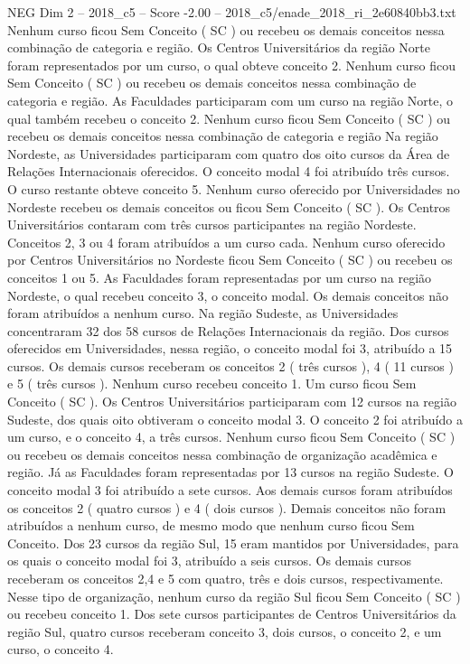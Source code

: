 \begin{textsample}{NEG Dim 2 – 2018\_c5 – Score -2.00 – 2018\_c5/enade\_2018\_ri\_2e60840bb3.txt}
Nenhum curso ficou Sem Conceito ( SC ) ou recebeu os demais conceitos nessa combinação de categoria e região.
Os Centros Universitários da região Norte foram representados por um curso, o qual obteve conceito 2.
Nenhum curso ficou Sem Conceito ( SC ) ou recebeu os demais conceitos nessa combinação de categoria e região.
As Faculdades participaram com um curso na região Norte, o qual também recebeu o conceito 2.
Nenhum curso ficou Sem Conceito ( SC ) ou recebeu os demais conceitos nessa combinação de categoria e região Na região Nordeste, as Universidades participaram com quatro dos oito cursos da Área de Relações Internacionais oferecidos.
O conceito modal 4 foi atribuído três cursos.
O curso restante obteve conceito 5.
Nenhum curso oferecido por Universidades no Nordeste recebeu os demais conceitos ou ficou Sem Conceito ( SC ).
Os Centros Universitários contaram com três cursos participantes na região Nordeste.
Conceitos 2, 3 ou 4 foram atribuídos a um curso cada.
Nenhum curso oferecido por Centros Universitários no Nordeste ficou Sem Conceito ( SC ) ou recebeu os conceitos 1 ou 5.
As Faculdades foram representadas por um curso na região Nordeste, o qual recebeu conceito 3, o conceito modal.
Os demais conceitos não foram atribuídos a nenhum curso.
Na região Sudeste, as Universidades concentraram 32 dos 58 cursos de Relações Internacionais da região.
Dos cursos oferecidos em Universidades, nessa região, o conceito modal foi 3, atribuído a 15 cursos.
Os demais cursos receberam os conceitos 2 ( três cursos ), 4 ( 11 cursos ) e 5 ( três cursos ).
Nenhum curso recebeu conceito 1.
Um curso ficou Sem Conceito ( SC ).
Os Centros Universitários participaram com 12 cursos na região Sudeste, dos quais oito obtiveram o conceito modal 3.
O conceito 2 foi atribuído a um curso, e o conceito 4, a três cursos.
Nenhum curso ficou Sem Conceito ( SC ) ou recebeu os demais conceitos nessa combinação de organização acadêmica e região.
Já as Faculdades foram representadas por 13 cursos na região Sudeste.
O conceito modal 3 foi atribuído a sete cursos.
Aos demais cursos foram atribuídos os conceitos 2 ( quatro cursos ) e 4 ( dois cursos ).
Demais conceitos não foram atribuídos a nenhum curso, de mesmo modo que nenhum curso ficou Sem Conceito.
Dos 23 cursos da região Sul, 15 eram mantidos por Universidades, para os quais o conceito modal foi 3, atribuído a seis cursos.
Os demais cursos receberam os conceitos 2,4 e 5 com quatro, três e dois cursos, respectivamente.
Nesse tipo de organização, nenhum curso da região Sul ficou Sem Conceito ( SC ) ou recebeu conceito 1.
Dos sete cursos participantes de Centros Universitários da região Sul, quatro cursos receberam conceito 3, dois cursos, o conceito 2, e um curso, o conceito 4.

\end{textsample}
